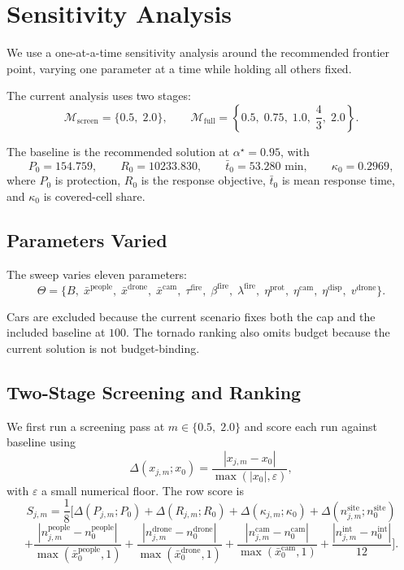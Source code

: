 \section{Sensitivity Analysis}

\setlength{\parskip}{0.7em}
\setlength{\parindent}{0pt}

We use a one-at-a-time sensitivity analysis around the recommended frontier point, varying one parameter at a time while holding all others fixed.

The current analysis uses two stages:
\[
\mathcal{M}_{\mathrm{screen}} = \{0.5,\;2.0\},
\qquad
\mathcal{M}_{\mathrm{full}} = \left\{0.5,\;0.75,\;1.0,\;\frac{4}{3},\;2.0\right\}.
\]

The baseline is the recommended solution at $\alpha^\star = 0.95$, with
\[
P_0 = 154.759,
\qquad
R_0 = 10233.830,
\qquad
\bar{t}_0 = 53.280 \text{ min},
\qquad
\kappa_0 = 0.2969,
\]
where $P_0$ is protection, $R_0$ is the response objective, $\bar{t}_0$ is mean response time, and $\kappa_0$ is covered-cell share.

\subsection{Parameters Varied}

The sweep varies eleven parameters:
\[
\Theta =
\{
B,\;
\bar{x}^{\mathrm{people}},\;
\bar{x}^{\mathrm{drone}},\;
\bar{x}^{\mathrm{cam}},\;
\tau^{\mathrm{fire}},\;
\beta^{\mathrm{fire}},\;
\lambda^{\mathrm{fire}},\;
\eta^{\mathrm{prot}},\;
\eta^{\mathrm{cam}},\;
\eta^{\mathrm{disp}},\;
v^{\mathrm{drone}}
\}.
\]

Cars are excluded because the current scenario fixes both the cap and the included baseline at $100$. The tornado ranking also omits budget because the current solution is not budget-binding.

\subsection{Two-Stage Screening and Ranking}

We first run a screening pass at $m \in \{0.5,\;2.0\}$ and score each run against baseline using
\[
\Delta(x_{j,m};x_0)
=
\frac{|x_{j,m} - x_0|}{\max(|x_0|,\varepsilon)},
\]
with $\varepsilon$ a small numerical floor. The row score is
\[
S_{j,m}
=
\frac{1}{8}
\Biggl[
\Delta(P_{j,m};P_0)
+
\Delta(R_{j,m};R_0)
+
\Delta(\kappa_{j,m};\kappa_0)
+
\Delta(n^{\mathrm{site}}_{j,m};n^{\mathrm{site}}_0)
\]
\[
+
\frac{|n^{\mathrm{people}}_{j,m} - n^{\mathrm{people}}_0|}{\max(\bar{x}^{\mathrm{people}}_0,1)}
+
\frac{|n^{\mathrm{drone}}_{j,m} - n^{\mathrm{drone}}_0|}{\max(\bar{x}^{\mathrm{drone}}_0,1)}
+
\frac{|n^{\mathrm{cam}}_{j,m} - n^{\mathrm{cam}}_0|}{\max(\bar{x}^{\mathrm{cam}}_0,1)}
+
\frac{|n^{\mathrm{int}}_{j,m} - n^{\mathrm{int}}_0|}{12}
\Biggr].
\]

